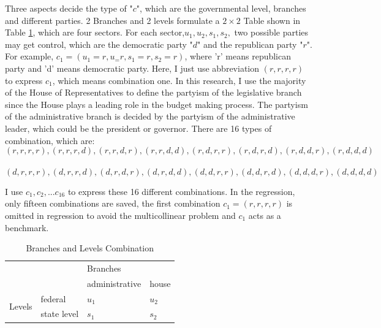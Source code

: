 Three aspects decide the type of "$c$", which are the governmental level, branches and different parties. 2 Branches and 2 levels formulate a $2\times2$ Table shown in Table \ref*{Table 2.6}, which are four sectors. For each sector,$ u_1, u_2, s_1, s_2,$ two possible parties may get control, which are the democratic party "$d$" and the republican party "$r$". For example, $c_1 = (u_1 = r, u_ = r, s_1 = r, s_2 = r)$, where ’r’ means republican party and ’d’ means democratic party. Here, I just use abbreviation $(r,r,r,r)$ to express $c_1$, which means combination one. In this research, I use the majority of the House of Representatives to define the partyism of the legislative branch since the House plays a leading role in the budget making process. The partyism of the administrative branch is decided by the partyism of the administrative leader, which could be the president or governor. There are 16 types of combination, which are:
$$(r, r, r, r), (r, r, r, d), (r, r, d, r), (r, r, d, d), (r, d, r, r), (r, d, r, d), (r, d, d, r), (r, d, d, d)$$\\$$(d, r, r, r), (d, r, r, d), (d, r, d, r), (d, r, d, d), (d, d, r, r), (d, d, r, d), (d, d, d, r), (d, d, d, d) $$

I use $c_1, c_2, . . . c_{16}$ to express these 16 different combinations. In the regression,
only fifteen combinations are saved, the first combination $c_1 = (r, r, r, r)$ is omitted in regression to avoid the multicollinear problem and $c_1$ acts as a benchmark.

\begin{table}[H]
    \centering
    \caption{Branches and Levels Combination}
    \begin{tabular}{cp{7.145em}p{8.43em}p{6.145em}}
        \toprule
        \multicolumn{2}{c}{\multirow{2}[4]{*}{}}       & \multicolumn{2}{p{14.575em}}{Branches}                 \\
        \cmidrule{3-4}    \multicolumn{2}{c}{}         & administrative                         & house         \\
        \midrule
        \multicolumn{1}{c}{\multirow{2}[4]{*}{Levels}} & federal                                & $u_1$ & $u_2$ \\
        \cmidrule{2-4}                                 & state level                            & $s_1$ & $s_2$ \\
        \bottomrule
    \end{tabular}%
    \label{Table 2.6}%
\end{table}%

